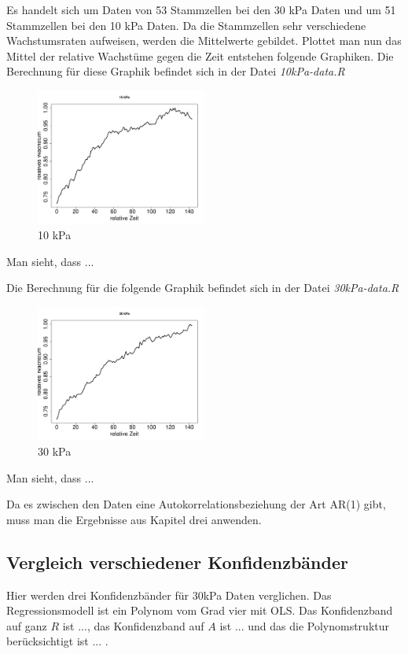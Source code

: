 \documentclass[12pt,a4paper]{article}
\theoremstyle{definition}
\theoremstyle{definition}
\theoremstyle{definition}
\theoremstyle{definition}
\begin{document}
Es handelt sich um Daten von 53 Stammzellen bei den 30 kPa Daten und um 51 Stammzellen bei den 10 kPa Daten. Da die Stammzellen sehr verschiedene Wachstumsraten aufweisen, werden die Mittelwerte gebildet. 
Plottet man nun das Mittel der relative Wachstüme gegen die Zeit entstehen folgende Graphiken. Die Berechnung für diese Graphik befindet sich in der Datei \textit{10kPa-data.R}

\begin{figure}[H] 
  \centering
     \includegraphics[width=0.5\textwidth]{10kPa-data.pdf}
  \caption{10 kPa}
  \label{10kPa-data}
\end{figure}

Man sieht, dass ...

Die Berechnung für die folgende Graphik befindet sich in der Datei \textit{30kPa-data.R}

\begin{figure}[H] 
  \centering
     \includegraphics[width=0.5\textwidth]{30kPa-data.pdf}
  \caption{30 kPa}
  \label{30kPa-data}
\end{figure}

Man sieht, dass ...

Da es zwischen den Daten eine Autokorrelationsbeziehung der Art AR(1) gibt, muss man die Ergebnisse aus Kapitel drei anwenden.


\subsection{Vergleich verschiedener Konfidenzbänder}
Hier werden drei Konfidenzbänder für 30kPa Daten verglichen. Das Regressionsmodell ist ein Polynom vom Grad vier mit OLS. Das Konfidenzband auf ganz $R$ ist ..., das Konfidenzband auf $A$ ist ... und das die Polynomstruktur berücksichtigt ist ... . 
\end{document}
